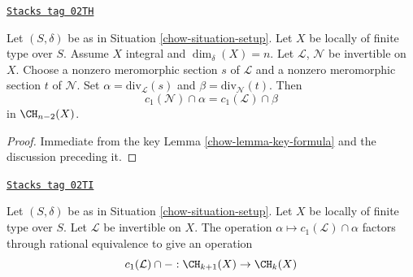 \begin{lemma}
\label{chow-lemma-commutativity-on-integral}
\href{https://stacks.math.columbia.edu/tag/02TH}{\texttt{Stacks tag 02TH}}

Let $(S, \delta)$ be as in Situation \ref{chow-situation-setup}.
Let $X$ be locally of finite type over $S$.
Assume $X$ integral and $\dim_\delta(X) = n$.
Let $\mathcal{L}$, $\mathcal{N}$ be invertible on $X$.
Choose a nonzero meromorphic section $s$ of $\mathcal{L}$
and a nonzero meromorphic section $t$ of $\mathcal{N}$.
Set $\alpha = \text{div}_\mathcal{L}(s)$ and
$\beta = \text{div}_\mathcal{N}(t)$.
Then
$$
c_1(\mathcal{N}) \cap \alpha
=
c_1(\mathcal{L}) \cap \beta
$$
in $\CH_{n - 2}(X)$.
\end{lemma}

\begin{proof}

Immediate from the key Lemma \ref{chow-lemma-key-formula}
and the discussion preceding it.
\end{proof}

\begin{lemma}[Factors]
\label{chow-lemma-factors}
\href{https://stacks.math.columbia.edu/tag/02TI}{\texttt{Stacks tag 02TI}}

Let $(S, \delta)$ be as in Situation \ref{chow-situation-setup}.
Let $X$ be locally of finite type over $S$.
Let $\mathcal{L}$ be invertible on $X$.
The operation $\alpha \mapsto c_1(\mathcal{L}) \cap \alpha$
factors through rational equivalence to give an operation
$$
c_1(\mathcal{L}) \cap - : \CH_{k + 1}(X) \to \CH_k(X)
$$
\end{lemma}

